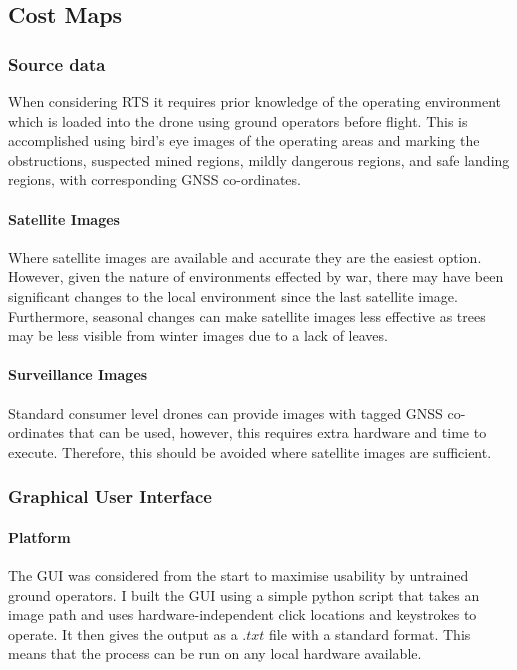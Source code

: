\subsection{Cost Maps}
\subsubsection{Source data}
When considering \gls{RTS} it requires prior knowledge of the operating environment which is loaded into the drone using ground operators before flight. This is accomplished using bird's eye images of the operating areas and marking the obstructions, suspected mined regions, mildly dangerous regions, and safe landing regions, with corresponding \gls{GNSS} co-ordinates.
\paragraph{Satellite Images}
Where satellite images are available and accurate they are the easiest option. However, given the nature of environments effected by war, there may have been significant changes to the local environment since the last satellite image. Furthermore, seasonal changes can make satellite images less effective as trees may be less visible from winter images due to a lack of leaves.
\paragraph{Surveillance Images}
Standard consumer level drones can provide images with tagged \gls{GNSS} co-ordinates that can be used, however, this requires extra hardware and time to execute. Therefore, this should be avoided where satellite images are sufficient.

\subsubsection{Graphical User Interface}
\paragraph{Platform} 
The \gls{GUI} was considered from the start to maximise usability by untrained ground operators. I built the \gls{GUI} using a simple python script that takes an image path and uses hardware-independent click locations and keystrokes to operate. It then gives the output as a $.txt$ file with a standard format. This means that the process can be run on any local hardware available.
